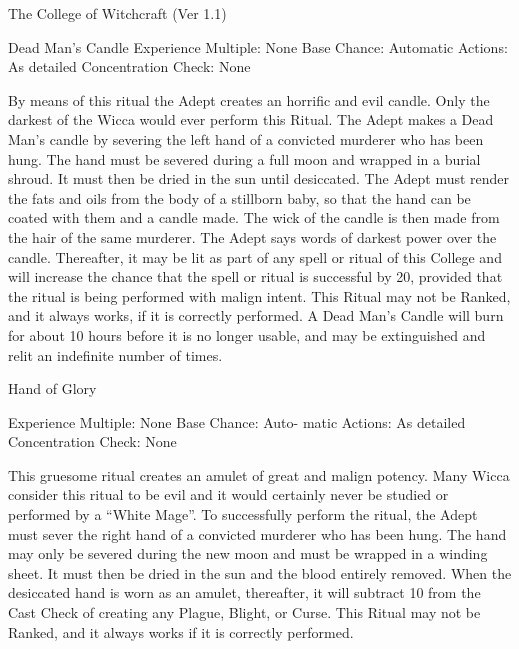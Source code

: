 \begin{Chapter}{The College of Witchcraft (Ver 1.1)}
\begin{ritual}[R-3]{Dead Man’s Candle}
Experience  Multiple:  None
Base  Chance:  Automatic 
Actions: As detailed 
Concentration Check: None 
\begin{effects}
By means of this ritual the Adept creates an horrific and evil candle.
Only the darkest of the Wicca would ever perform this Ritual.  The
Adept makes a Dead Man’s candle by severing the left hand of a
convicted murderer who has been hung.  The hand must be severed during
a full moon and wrapped in a burial shroud. It must then be dried in
the sun until desiccated. The Adept must render the fats and oils from
the body of a stillborn baby, so that the hand can be coated with them
and a candle made.  The wick of the candle is then made from the hair
of the same murderer.  The Adept says words of darkest power over the
candle.  Thereafter, it may be lit as part of any spell or ritual of
this College and will increase the chance that the spell or ritual is
successful by 20, provided that the ritual is being performed with
malign intent.  This Ritual may not be Ranked, and it always works, if
it is correctly performed.  A Dead Man’s Candle will burn for about 10
hours before it is no longer usable, and may be extinguished and relit
an indefinite number of times.
\end{effects}
\end{ritual}

\begin{ritual}[R-4]{Hand of Glory }

Experience  Multiple:  None
Base  Chance:  Auto-
matic 
Actions: As detailed 
Concentration Check: None 
\begin{effects}
This gruesome ritual creates an amulet of great and malign potency.
Many Wicca consider this ritual to be evil and it would certainly
never be studied or performed by a “White Mage”.  To successfully
perform the ritual, the Adept must sever the right hand of a convicted
murderer who has been hung.  The hand may only be severed during the
new moon and must be wrapped in a winding sheet. It must then be dried
in the sun and the blood entirely removed.  When the desiccated hand
is worn as an amulet, thereafter, it will subtract 10 from the Cast
Check of creating any Plague, Blight, or Curse.  This Ritual may not
be Ranked, and it always works if it is correctly performed.
\end{effects}
\end{ritual}


\end{Chapter}

